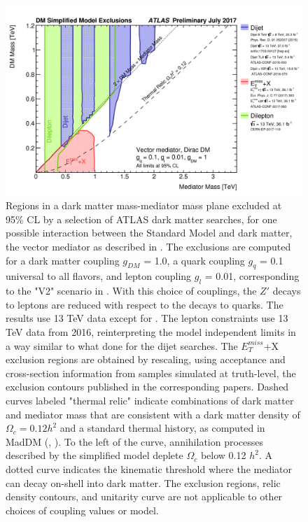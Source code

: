 \begin{figure}[]
	\centering
	\includegraphics[width=\columnwidth]{figures/Conclusion/DMExclusions_Lepton.png}
	\caption{Regions in a dark matter mass-mediator mass plane excluded at 95\% CL by a selection of ATLAS dark matter searches, for one possible interaction between the Standard Model and dark matter, the vector mediator as described in \cite{DMWorkingGroup}. The exclusions are computed for a dark matter coupling $g_{DM}$ = 1.0, a quark coupling $g_q$ = 0.1 universal to all flavors, and lepton coupling $g_l$ = 0.01, corresponding to the "V2" scenario in \cite{DMWorkingGroup}. With this choice of couplings, the $Z'$ decays to leptons are reduced with respect to the decays to quarks. The results use 13 TeV data except for \cite{DijetResonance8TeV_ATLAS}.  The lepton constraints use 13\,TeV data from 2016, reinterpreting the model independent limits in a way similar to what done for the dijet searches. The $E_T^{miss}$+X exclusion regions are obtained by rescaling, using acceptance and cross-section information from samples simulated at truth-level, the exclusion contours published in the corresponding papers. Dashed curves labeled "thermal relic" indicate combinations of dark matter and mediator mass that are consistent with a dark matter density of $\Omega_c = 0.12 h^2$  and a standard thermal history, as computed in MadDM (\cite{MadDM}, \cite{DMWorkingGroup}). To the left of the curve, annihilation processes described by the simplified model deplete $\Omega_c$ below 0.12 $h^2$. A dotted curve indicates the kinematic threshold where the mediator can decay on-shell into dark matter. The exclusion regions, relic density contours, and unitarity curve are not applicable to other choices of coupling values or model.}
	\label{fig:DMExclusions_Lepton}
\end{figure}

